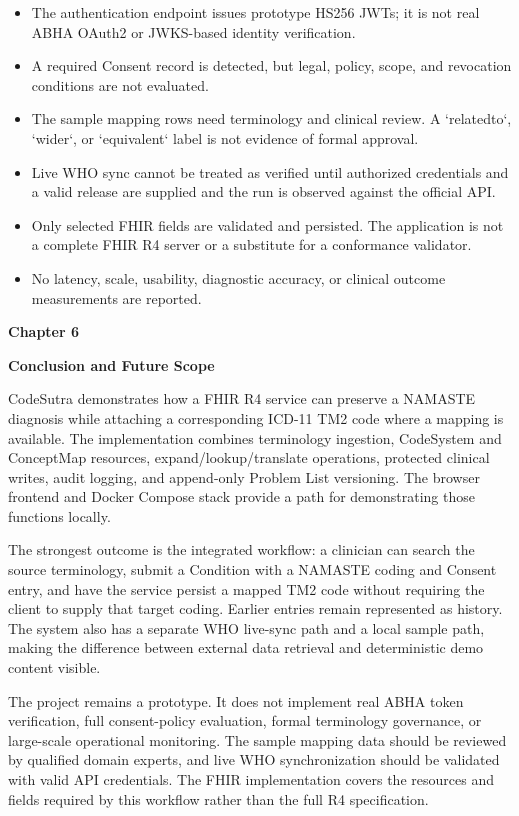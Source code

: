 \documentclass[12pt,a4paper,oneside]{report}
\begin{document}
\begin{itemize}
\item The authentication endpoint issues prototype HS256 JWTs; it is not real ABHA OAuth2 or JWKS-based identity verification.
\item A required Consent record is detected, but legal, policy, scope, and revocation conditions are not evaluated.
\item The sample mapping rows need terminology and clinical review. A `relatedto`, `wider`, or `equivalent` label is not evidence of formal approval.
\item Live WHO sync cannot be treated as verified until authorized credentials and a valid release are supplied and the run is observed against the official API.
\item Only selected FHIR fields are validated and persisted. The application is not a complete FHIR R4 server or a substitute for a conformance validator.
\item No latency, scale, usability, diagnostic accuracy, or clinical outcome measurements are reported.
\end{itemize}
\clearpage
\clearpage\begin{center}\Large\textbf{Chapter 6}\end{center}
\begin{center}\LARGE\textbf{\textbf{Conclusion and Future Scope}}\end{center}\vspace{8pt}
CodeSutra demonstrates how a FHIR R4 service can preserve a NAMASTE diagnosis while attaching a corresponding ICD-11 TM2 code where a mapping is available. The implementation combines terminology ingestion, CodeSystem and ConceptMap resources, expand/lookup/translate operations, protected clinical writes, audit logging, and append-only Problem List versioning. The browser frontend and Docker Compose stack provide a path for demonstrating those functions locally.

The strongest outcome is the integrated workflow: a clinician can search the source terminology, submit a Condition with a NAMASTE coding and Consent entry, and have the service persist a mapped TM2 code without requiring the client to supply that target coding. Earlier entries remain represented as history. The system also has a separate WHO live-sync path and a local sample path, making the difference between external data retrieval and deterministic demo content visible.

The project remains a prototype. It does not implement real ABHA token verification, full consent-policy evaluation, formal terminology governance, or large-scale operational monitoring. The sample mapping data should be reviewed by qualified domain experts, and live WHO synchronization should be validated with valid API credentials. The FHIR implementation covers the resources and fields required by this workflow rather than the full R4 specification.
\end{document}
